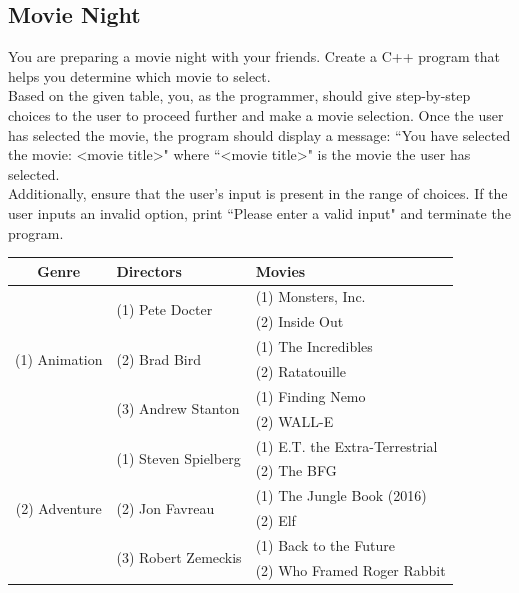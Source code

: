 \subsection{Movie Night}

You are preparing a movie night with your friends. Create a C++ program that helps you determine which movie to select. \\

Based on the given table, you, as the programmer, should give step-by-step choices to the user to proceed further and make a movie selection. Once the user has selected the movie, the program should display a message: ``You have selected the movie: <movie title>" where ``<movie title>" is the movie the user has selected. \\

Additionally, ensure that the user's input is present in the range of choices. If the user inputs an invalid option, print ``Please enter a valid input" and terminate the program. 

\begin{table}[h!]
\centering
\begin{tabular}{|c|l|l|}
\hline
\textbf{Genre}        & \textbf{Directors}         & \textbf{Movies}                 \\ \hline
\multirow{6}{*}{(1) Animation} & \multirow{2}{*}{(1) Pete Docter} & (1) Monsters, Inc.            \\ \cline{3-3} 
                   &                              & (2) Inside Out      \\ \cline{2-3} 
                   & \multirow{2}{*}{(2) 	Brad Bird}     & (1) The Incredibles          \\ \cline{3-3} 
                   &                              & (2) Ratatouille                \\ \cline{2-3} 
                   & \multirow{2}{*}{(3) Andrew Stanton} & (1) Finding Nemo             \\ \cline{3-3} 
                   &                              & (2) WALL-E      \\ \hline
\multirow{6}{*}{(2) Adventure} & \multirow{2}{*}{(1) Steven Spielberg}       & (1) E.T. the Extra-Terrestrial \\ \cline{3-3} 
                   &                              & (2) The BFG           \\ \cline{2-3} 
                   & \multirow{2}{*}{(2) 	Jon Favreau}      & (1) The Jungle Book (2016)      \\ \cline{3-3} 
                   &                              & (2) Elf              \\ \cline{2-3} 
                   & \multirow{2}{*}{(3) Robert Zemeckis}     & (1) Back to the Future          \\ \cline{3-3} 
                   &                              & (2) Who Framed Roger Rabbit                 \\ \hline
\end{tabular}
\end{table}


